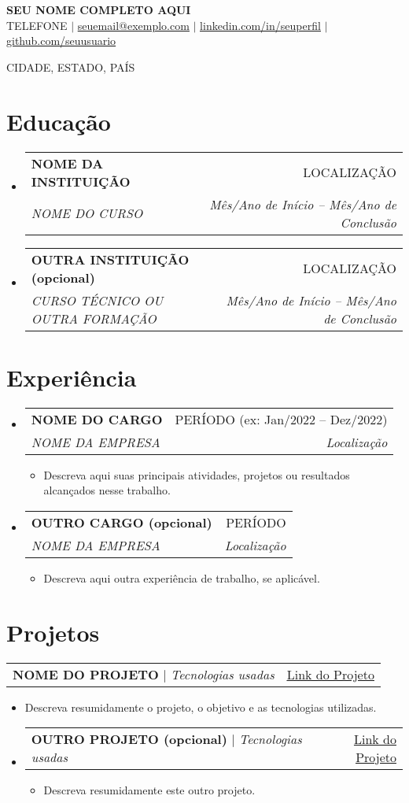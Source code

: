 \documentclass[letterpaper,11pt]{article}
\makeatletter
\newcommand{\resumeItem}[1]{
  \item\small{
    {#1 \vspace{-2pt}}
  }
}
\newcommand{\resumeSubheading}[4]{
  \vspace{-2pt}\item
    \begin{tabular*}{0.97\textwidth}[t]{l@{\extracolsep{\fill}}r}
      \textbf{#1} & #2 \\
      \textit{\small#3} & \textit{\small #4} \\
    \end{tabular*}\vspace{-7pt}
}
\newcommand{\resumeProjectHeading}[2]{
    \item
    \begin{tabular*}{0.97\textwidth}{l@{\extracolsep{\fill}}r}
      \small#1 & #2 \\
    \end{tabular*}\vspace{-7pt}
}
\newcommand{\resumeSubHeadingListStart}{\begin{itemize}[leftmargin=0.15in, label={}]}
\newcommand{\resumeSubHeadingListEnd}{\end{itemize}}
\newcommand{\resumeItemListStart}{\begin{itemize}}
\newcommand{\resumeItemListEnd}{\end{itemize}\vspace{-5pt}}
\makeatother
\begin{document}
\begin{center}
    \textbf{\Huge \scshape SEU NOME COMPLETO AQUI} \\ \vspace{1pt}
    \small TELEFONE $|$ \href{mailto:seuemail@exemplo.com}{\underline{seuemail@exemplo.com}} $|$ 
    \href{https://linkedin.com/in/seuperfil}{\underline{linkedin.com/in/seuperfil}} $|$
    \href{https://github.com/seuusuario}{\underline{github.com/seuusuario}}
\end{center}
\begin{center}
\small{CIDADE, ESTADO, PAÍS}    
\end{center}

\section{Educação}
  \resumeSubHeadingListStart
    \resumeSubheading
      {NOME DA INSTITUIÇÃO}{LOCALIZAÇÃO}
      {NOME DO CURSO}{Mês/Ano de Início -- Mês/Ano de Conclusão}
    \resumeSubheading
      {OUTRA INSTITUIÇÃO (opcional)}{LOCALIZAÇÃO}
      {CURSO TÉCNICO OU OUTRA FORMAÇÃO}{Mês/Ano de Início -- Mês/Ano de Conclusão}
  \resumeSubHeadingListEnd

\section{Experiência}
  \resumeSubHeadingListStart
  \resumeSubheading
      {NOME DO CARGO}{PERÍODO (ex: Jan/2022 -- Dez/2022)}
      {NOME DA EMPRESA}{Localização}
      \resumeItemListStart
        \resumeItem{Descreva aqui suas principais atividades, projetos ou resultados alcançados nesse trabalho.}
      \resumeItemListEnd

    \resumeSubheading
      {OUTRO CARGO (opcional)}{PERÍODO}
      {NOME DA EMPRESA}{Localização}
      \resumeItemListStart
        \resumeItem{Descreva aqui outra experiência de trabalho, se aplicável.}
      \resumeItemListEnd
  \resumeSubHeadingListEnd

\section{Projetos}
    \resumeProjectHeading
      {\textbf{NOME DO PROJETO} $|$ \emph{Tecnologias usadas}}{\href{URLdoProjeto}{\underline{Link do Projeto}}}
      \resumeItemListStart
        \resumeItem{Descreva resumidamente o projeto, o objetivo e as tecnologias utilizadas.}
    \resumeItemListEnd
    \resumeSubHeadingListStart
    \resumeProjectHeading
      {\textbf{OUTRO PROJETO (opcional)} $|$ \emph{Tecnologias usadas}}{\href{URLdoProjeto}{\underline{Link do Projeto}}}
      \resumeItemListStart
        \resumeItem{Descreva resumidamente este outro projeto.}
    \resumeItemListEnd
    \resumeSubHeadingListEnd
\end{document}
